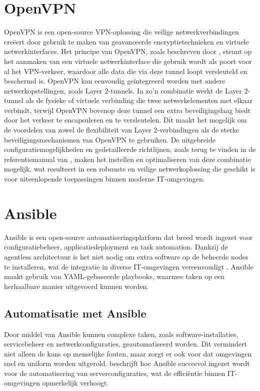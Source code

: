   \section{OpenVPN}
  \label{sec:openvpn}

  OpenVPN is een open-source VPN-oplossing die veilige netwerkverbindingen creëert door gebruik te maken van geavanceerde encryptietechnieken en virtuele netwerkinterfaces. 
  Het principe van OpenVPN, zoals beschreven door \textcite{Seppaenen2014}, steunt op het aanmaken van een virtuele netwerkinterface die gebruik wordt als poort voor al het VPN-verkeer, 
  waardoor alle data die via deze tunnel loopt versleuteld en beschermd is. OpenVPN kan eenvoudig geïntegreerd worden met andere netwerkopstellingen, zoals Layer 2-tunnels. 
  In zo'n combinatie werkt de Layer 2-tunnel als de fysieke of virtuele verbinding die twee netwerkelementen met elkaar verbindt, terwijl OpenVPN bovenop deze tunnel een extra beveiligingslaag biedt door het verkeer te encapsuleren en te versleutelen. 
  Dit maakt het mogelijk om de voordelen van zowel de flexibiliteit van Layer 2-verbindingen als de sterke beveiligingsmechanismen van OpenVPN te gebruiken. 
  De uitgebreide configuratiemogelijkheden en gedetailleerde richtlijnen, zoals terug te vinden in de referentiemanual van \textcite{Yonan}, maken het instellen en optimaliseren van deze combinatie mogelijk, 
  wat resulteert in een robuuste en veilige netwerkoplossing die geschikt is voor uiteenlopende toepassingen binnen moderne IT-omgevingen.

  \section{Ansible}
  \label{sec:ansible}

  Ansible is een open-source automatiseringsplatform dat breed wordt ingezet voor configuratiebeheer, applicatiedeployment en task automation. 
  Dankzij de agentless architectuur is het niet nodig om extra software op de beheerde nodes te installeren, wat de integratie in diverse IT-omgevingen vereenvoudigt \textcite{Documentation2025}. 
  Ansible maakt gebruik van YAML-gebaseerde playbooks, waarmee taken op een herhaalbare manier uitgevoerd kunnen worden.

  \subsection*{Automatisatie met Ansible}
  Door middel van Ansible kunnen complexe taken, zoals software-installaties, servicebeheer en netwerkconfiguraties, geautomatiseerd worden. 
  Dit vermindert niet alleen de kans op menselijke fouten, maar zorgt er ook voor dat omgevingen snel en uniform worden uitgerold. 
  \textcite{Likitha2022} beschrijft hoe Ansible succesvol ingezet wordt voor de automatisering van serverconfiguraties, wat de efficiëntie binnen IT-omgevingen opmerkelijk verhoogt.
  
